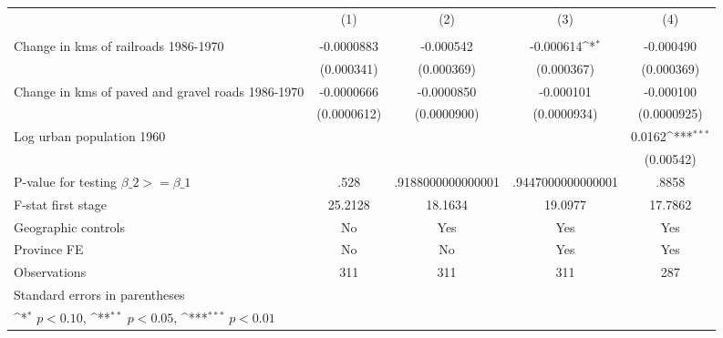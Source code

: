 {
\def\sym#1{\ifmmode^{#1}\else\(^{#1}\)\fi}
\begin{tabular}{l*{4}{c}}
\hline\hline
                &\multicolumn{1}{c}{(1)}&\multicolumn{1}{c}{(2)}&\multicolumn{1}{c}{(3)}&\multicolumn{1}{c}{(4)}\\
                &\multicolumn{1}{c}{}&\multicolumn{1}{c}{}&\multicolumn{1}{c}{}&\multicolumn{1}{c}{}\\
\hline
Change in kms of railroads 1986-1970&-0.0000883         &-0.000542         &-0.000614\sym{*}  &-0.000490         \\
                &(0.000341)         &(0.000369)         &(0.000367)         &(0.000369)         \\
[1em]
Change in kms of paved and gravel roads 1986-1970&-0.0000666         &-0.0000850         &-0.000101         &-0.000100         \\
                &(0.0000612)         &(0.0000900)         &(0.0000934)         &(0.0000925)         \\
[1em]
Log urban population 1960&                  &                  &                  &   0.0162\sym{***}\\
                &                  &                  &                  &(0.00542)         \\
\hline
P-value for testing $\beta\_{2} >= \beta\_{1}$&     .528         &.9188000000000001         &.9447000000000001         &    .8858         \\
F-stat first stage&  25.2128         &  18.1634         &  19.0977         &  17.7862         \\
Geographic controls&       No         &      Yes         &      Yes         &      Yes         \\
Province FE     &       No         &       No         &      Yes         &      Yes         \\
Observations    &      311         &      311         &      311         &      287         \\
\hline\hline
\multicolumn{5}{l}{\footnotesize Standard errors in parentheses}\\
\multicolumn{5}{l}{\footnotesize \sym{*} \(p<0.10\), \sym{**} \(p<0.05\), \sym{***} \(p<0.01\)}\\
\end{tabular}
}
